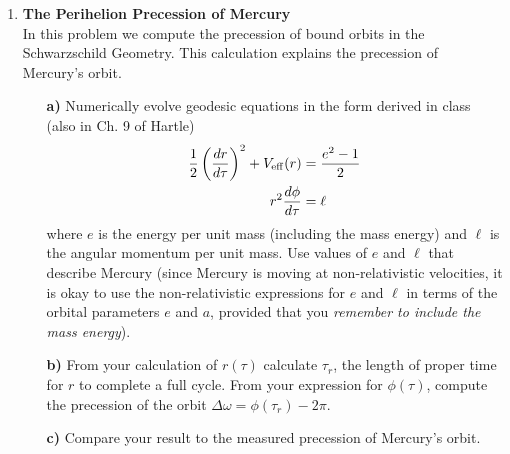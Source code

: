 \documentclass[11pt]{article}
\begin{document}
\begin{enumerate}

\item
{\bf The Perihelion Precession of Mercury} \\
In this problem we compute the precession of bound orbits in the Schwarzschild Geometry. This calculation explains the precession of Mercury's orbit.

\begin{itemize}
\item[\bf a)] Numerically evolve geodesic equations in the form derived in class (also in Ch. 9 of Hartle)
\begin{align}
\frac{1}{2}\left(\frac{dr}{d\tau}\right)^2+ V_{\rm eff}(r)&=\frac{e^2-1}{2} \nonumber \\
r^2\frac{d\phi}{d\tau}&=\ell
\end{align}
where $e$ is the energy per unit mass (including the mass energy) and $\ell$ is the angular momentum per unit mass. Use values of $e$ and $\ell$ that describe Mercury (since Mercury is moving at non-relativistic velocities, it is okay to use the non-relativistic expressions for $e$ and $\ell$ in terms of the orbital parameters $e$ and $a$, provided that you \emph{remember to include the mass energy}).

\item[\bf b)] From your calculation of $r(\tau)$ calculate $\tau_r$, the length of proper time for $r$ to complete a full cycle. From your expression for $\phi(\tau)$, compute the precession of the orbit $\Delta \omega =\phi(\tau_r)-2\pi$.

\item[\bf c)] Compare your result to the measured precession of Mercury's orbit.

\end{itemize}

%
%
%
%
%



\end{enumerate}
\end{document}

